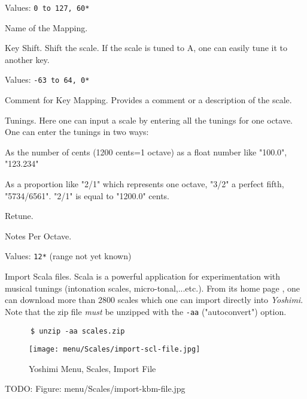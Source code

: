    Values: \texttt{0 to 127, 60*}

   Name of the Mapping.

   Key Shift.
   Shift the scale. If the scale is tuned to A, one can easily tune it to
   another key.

   Values: \texttt{-63 to 64, 0*}

   Comment for Key Mapping.
   Provides a comment or a description of the scale.

   Tunings.
   Here one can input a scale by entering all the tunings for one octave. 
   One can enter the tunings in two ways: 

   \begin{enumber}
      \item As the number of cents (1200 cents=1 octave) as a float number
      like "100.0", "123.234"
      \item As a proportion like "2/1" which represents one octave, "3/2" a
      perfect fifth, "5734/6561".  "2/1" is equal to "1200.0" cents.
   \end{enumber}

   Retune.

   Notes Per Octave.

   Values: \texttt{12*} (range not yet known)

   Import Scala files.
   Scala is a powerful application for experimentation with musical tunings
   (intonation scales, micro-tonal,...etc.). From its home page \cite{scala},
   one can download more than 2800 scales which one can import directly into
   \textsl{Yoshimi}.  Note that the zip file \textsl{must} be unzipped with
   the \texttt{-aa} ("autoconvert") option.

    \begin{verbatim}
      $ unzip -aa scales.zip
    \end{verbatim}

\begin{figure}[H]
   \centering 
   \texttt{[image: menu/Scales/import-scl-file.jpg]}
   \caption{Yoshimi Menu, Scales, Import File}
   \label{fig:yoshimi_menu_scales_import_file}
\end{figure}


   TODO: Figure: menu/Scales/import-kbm-file.jpg

